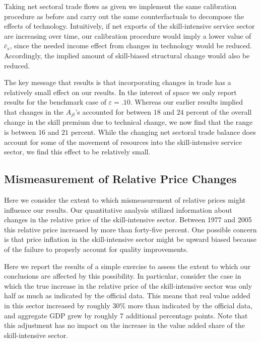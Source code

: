\documentclass[12pt,english]{article}
\begin{document}
{\normalsize Taking net sectoral trade flows as given we implement the same
calibration procedure as before and carry out the same counterfactuals to
decompose the effects of technology. Intuitively, if net exports of the
skill-intensive service sector are increasing over time, our calibration
procedure would imply a lower value of $\bar{c}_{s}$, since the needed
income effect from changes in technology would be reduced. Accordingly, the
implied amount of skill-biased structural change would also be reduced. }

{\normalsize The key message that results is that incorporating changes in
trade has a relatively small effect on our results. In the interest of space
we only report results for the benchmark case of $\varepsilon =.10$. Whereas
our earlier results implied that changes in the $A_{jt}$'s accounted for
between $18$ and $24$ percent of the overall change in the skill premium due
to technical change, we now find that the range is between $16$ and $21$
percent. While the changing net sectoral trade balance does account for some
of the movement of resources into the skill-intensive service sector, we
find this effect to be relatively small. }

\subsection{Mismeasurement of Relative Price Changes}

{\normalsize Here we consider the extent to which mismeasurement of relative
prices might influence our results. Our quantitative analysis utilized
information about changes in the relative price of the skill-intensive
sector. Between 1977 and 2005 this relative price increased by more than
forty-five percent. One possible concern is that price inflation in the
skill-intensive sector might be upward biased because of the failure to
properly account for quality improvements. }

{\normalsize Here we report the results of a simple exercise to assess the
extent to which our conclusions are affected by this possibility. In
particular, consider the case in which the true increase in the relative
price of the skill-intensive sector was only half as much as indicated by
the official data. This means that real value added in this sector increased
by roughly $30\%$ more than indicated by the official data, and aggregate
GDP grew by roughly 7 additional percentage points. Note that this
adjustment has no impact on the increase in the value added share of the
skill-intensive sector. }
\end{document}
